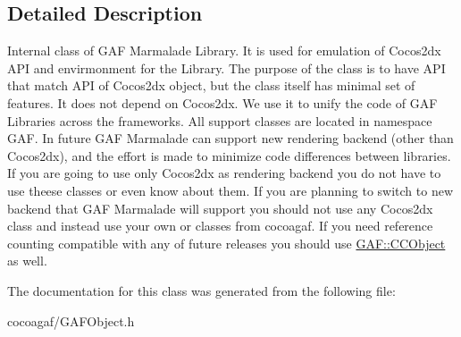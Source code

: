 \subsection{Detailed Description}
Internal class of G\-A\-F Marmalade Library. It is used for emulation of Cocos2dx A\-P\-I and envirmonment for the Library. The purpose of the class is to have A\-P\-I that match A\-P\-I of Cocos2dx object, but the class itself has minimal set of features. It does not depend on Cocos2dx. We use it to unify the code of G\-A\-F Libraries across the frameworks. All support classes are located in namespace G\-A\-F. In future G\-A\-F Marmalade can support new rendering backend (other than Cocos2dx), and the effort is made to minimize code differences between libraries. If you are going to use only Cocos2dx as rendering backend you do not have to use theese classes or even know about them. If you are planning to switch to new backend that G\-A\-F Marmalade will support you should not use any Cocos2dx class and instead use your own or classes from cocoagaf. If you need reference counting compatible with any of future releases you should use \hyperlink{class_g_a_f_1_1_c_c_object}{G\-A\-F\-::\-C\-C\-Object} as well. 

The documentation for this class was generated from the following file\-:\begin{DoxyCompactItemize}
\item 
cocoagaf/G\-A\-F\-Object.\-h\end{DoxyCompactItemize}
